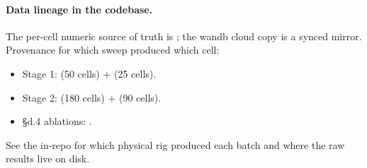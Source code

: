\paragraph{Data lineage in the codebase.}
The per-cell numeric source of truth is ; the wandb cloud copy is a synced mirror. Provenance for which sweep produced which cell:
\begin{itemize}
\item Stage 1:  (50 cells) +  (25 cells).
\item Stage 2:  (180 cells) +  (90 cells).
\item \S d.4 ablations: .
\end{itemize}

\noindent See the in-repo  for which physical rig produced each batch and where the raw results live on disk.
